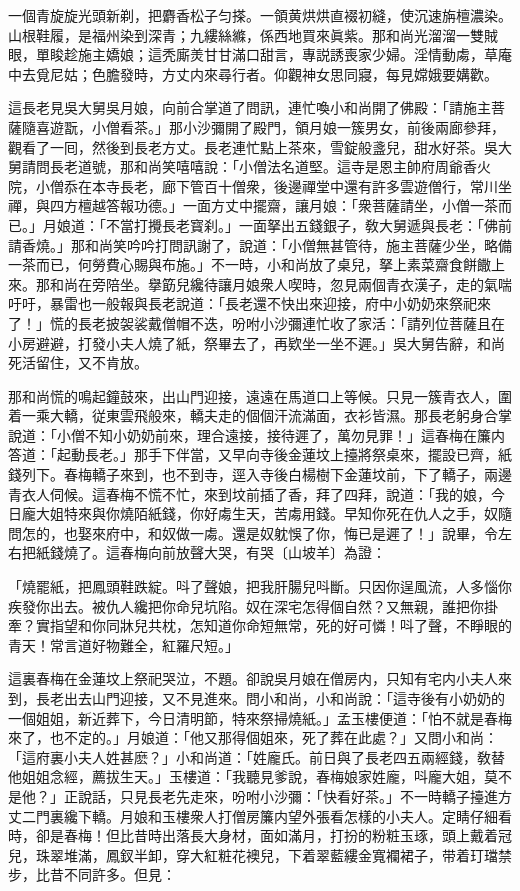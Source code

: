 \begin{myquote}
一個青旋旋光頭新剃，把麝香松子匀搽。一領黄烘烘直裰初縫，使沉速旃檀濃染。山根鞋履，是福州染到深青；九縷絲縧，係西地買來眞紫。那和尚光溜溜一雙賊眼，單睃趁施主嬌娘；這秃廝羙甘甘滿口甜言，專説誘喪家少婦。淫情動䖏，草庵中去覓尼姑；色膽發時，方丈内來尋行者。仰觀神女思同寢，每見嫦娥要媾歡。
\end{myquote}

這長老見吳大舅吳月娘，向前合掌道了問訊，連忙喚小和尚開了佛殿：「請施主菩薩隨喜遊翫，小僧看茶。」那小沙彌開了殿門，領月娘一簇男女，前後兩廊參拜，觀看了一囘，然後到長老方丈。長老連忙點上茶來，雪錠般盞兒，甜水好茶。吳大舅請問長老道號，那和尚笑嘻嘻說：「小僧法名道堅。這寺是恩主帥府周爺香火院，小僧忝在本寺長老，廊下管百十僧衆，後邊禪堂中還有許多雲遊僧行，常川坐禪，與四方檀越答報功德。」一面方丈中擺齋，讓月娘：「衆菩薩請坐，小僧一茶而已。」月娘道：「不當打攪長老寳刹。」一面拏出五錢銀子，敎大舅遞與長老：「佛前請香燒。」那和尚笑吟吟打問訊謝了，說道：「小僧無甚管待，施主菩薩少坐，略備一茶而已，何勞費心賜與布施。」不一時，小和尚放了桌兒，拏上素菜齋食餅饊上來。那和尚在旁陪坐。擧筯兒纔待讓月娘衆人喫時，忽見兩個青衣漢子，走的氣喘吁吁，暴雷也一般報與長老說道：「長老還不快出來迎接，府中小奶奶來祭祀來了！」慌的長老披袈裟戴僧帽不迭，吩咐小沙彌連忙收了家活：「請列位菩薩且在小房避避，打發小夫人燒了紙，祭畢去了，再欵坐一坐不遲。」吳大舅告辭，和尚死活留住，又不肯放。

那和尚慌的鳴起鐘鼓來，出山門迎接，遠遠在馬道口上等候。只見一簇青衣人，圍着一乘大轎，従東雲飛般來，轎夫走的個個汗流滿面，衣衫皆濕。那長老躬身合掌說道：「小僧不知小奶奶前來，理合遠接，接待遲了，萬勿見罪！」這春梅在簾内答道：「起動長老。」那手下伴當，又早向寺後金蓮坟上擡將祭桌來，擺設已齊，紙錢列下。春梅轎子來到，也不到寺，逕入寺後白楊樹下金蓮坟前，下了轎子，兩邊青衣人伺候。這春梅不慌不忙，來到坟前插了香，拜了四拜，說道：「我的娘，今日龐大姐特來與你燒陌紙錢，你好䖏生天，苦䖏用錢。早知你死在仇人之手，奴隨問怎的，也娶來府中，和奴做一䖏。還是奴躭悞了你，悔已是遲了！」說畢，令左右把紙錢燒了。這春梅向前放聲大哭，有哭〔山坡羊〕為證：

\begin{myquote}
「燒罷紙，把鳳頭鞋跌綻。呌了聲娘，把我肝腸兒呌斷。只因你逞風流，人多惱你疾發你出去。被仇人纔把你命兒坑陷。奴在深宅怎得個自然？又無親，誰把你掛牽？實指望和你同牀兒共枕，怎知道你命短無常，死的好可憐！呌了聲，不睜眼的青天！常言道好物難全，紅羅尺短。」
\end{myquote}

這裏春梅在金蓮坟上祭祀哭泣，不題。卻說吳月娘在僧房内，只知有宅内小夫人來到，長老出去山門迎接，又不見進來。問小和尚，小和尚說：「這寺後有小奶奶的一個姐姐，新近葬下，今日清明節，特來祭掃燒紙。」孟玉樓便道：「怕不就是春梅來了，也不定的。」月娘道：「他又那得個姐來，死了葬在此處？」又問小和尚：「這府裏小夫人姓甚麽？」小和尚道：「姓龐氏。前日與了長老四五兩經錢，敎替他姐姐念經，薦拔生天。」玉樓道：「我聽見爹說，春梅娘家姓龐，呌龐大姐，莫不是他？」正說話，只見長老先走來，吩咐小沙彌：「快看好茶。」不一時轎子擡進方丈二門裏纔下轎。月娘和玉樓衆人打僧房簾内望外張看怎樣的小夫人。定睛仔細看時，卻是春梅！但比昔時出落長大身材，面如滿月，打扮的粉粧玉琢，頭上戴着冠兒，珠翠堆滿，鳳釵半卸，穿大紅粧花襖兒，下着翠藍縷金寬襴裙子，带着玎璫禁步，比昔不同許多。但見：

